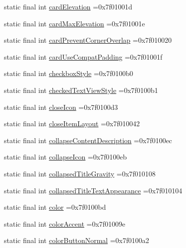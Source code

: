 \begin{DoxyCompactItemize}
static final int \hyperlink{classproject4_1_1xaria_1_1R_1_1attr_a5f564005af283aad344ea6cd4f219f1a}{card\+Elevation} =0x7f01001d
\item 
static final int \hyperlink{classproject4_1_1xaria_1_1R_1_1attr_a18c503e6c085a118afe64df20415981b}{card\+Max\+Elevation} =0x7f01001e
\item 
static final int \hyperlink{classproject4_1_1xaria_1_1R_1_1attr_a132e2ec7f095af58a041f0d72eb92090}{card\+Prevent\+Corner\+Overlap} =0x7f010020
\item 
static final int \hyperlink{classproject4_1_1xaria_1_1R_1_1attr_aa77872e3131bbd9b60cdf49697b9fbce}{card\+Use\+Compat\+Padding} =0x7f01001f
\item 
static final int \hyperlink{classproject4_1_1xaria_1_1R_1_1attr_ac94b7c28855c39d9a2ca2949d5c219df}{checkbox\+Style} =0x7f0100b0
\item 
static final int \hyperlink{classproject4_1_1xaria_1_1R_1_1attr_a7ec43308b6effc0e0b4e88e0961b9e1c}{checked\+Text\+View\+Style} =0x7f0100b1
\item 
static final int \hyperlink{classproject4_1_1xaria_1_1R_1_1attr_a74eef03066e2146a7eb7e53495af53c7}{close\+Icon} =0x7f0100d3
\item 
static final int \hyperlink{classproject4_1_1xaria_1_1R_1_1attr_ae6fd421b77209ccc406a4513fe3c4833}{close\+Item\+Layout} =0x7f010042
\item 
static final int \hyperlink{classproject4_1_1xaria_1_1R_1_1attr_a0801fe2783b9dec36e3b820ff3f2fba8}{collapse\+Content\+Description} =0x7f0100ec
\item 
static final int \hyperlink{classproject4_1_1xaria_1_1R_1_1attr_aa0bee61975f350438a31de737ca671d3}{collapse\+Icon} =0x7f0100eb
\item 
static final int \hyperlink{classproject4_1_1xaria_1_1R_1_1attr_a5db6931b35ad4127cb69af77ce5d6a19}{collapsed\+Title\+Gravity} =0x7f010108
\item 
static final int \hyperlink{classproject4_1_1xaria_1_1R_1_1attr_a4b638279c01852806429d4c21ffda47d}{collapsed\+Title\+Text\+Appearance} =0x7f010104
\item 
static final int \hyperlink{classproject4_1_1xaria_1_1R_1_1attr_adee954827e4c5b2937083c916967b725}{color} =0x7f0100bd
\item 
static final int \hyperlink{classproject4_1_1xaria_1_1R_1_1attr_a17c031145aa9f5722f6e81cb2930618f}{color\+Accent} =0x7f01009e
\item 
static final int \hyperlink{classproject4_1_1xaria_1_1R_1_1attr_aa53e582211b27337c14ac98d70a77327}{color\+Button\+Normal} =0x7f0100a2

\end{DoxyCompactItemize}
